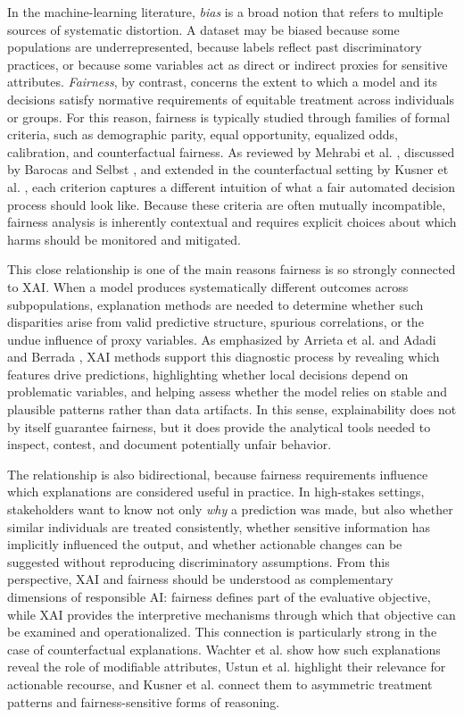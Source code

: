 In the machine-learning literature, \emph{bias} is a broad notion that refers to multiple sources of systematic distortion. A dataset may be biased because some populations are underrepresented, because labels reflect past discriminatory practices, or because some variables act as direct or indirect proxies for sensitive attributes. \emph{Fairness}, by contrast, concerns the extent to which a model and its decisions satisfy normative requirements of equitable treatment across individuals or groups. For this reason, fairness is typically studied through families of formal criteria, such as demographic parity, equal opportunity, equalized odds, calibration, and counterfactual fairness. As reviewed by Mehrabi et al. \cite{mehrabi2021}, discussed by Barocas and Selbst \cite{barocas2016big}, and extended in the counterfactual setting by Kusner et al. \cite{kusner2017counterfactual}, each criterion captures a different intuition of what a fair automated decision process should look like. Because these criteria are often mutually incompatible, fairness analysis is inherently contextual and requires explicit choices about which harms should be monitored and mitigated.

This close relationship is one of the main reasons fairness is so strongly connected to XAI. When a model produces systematically different outcomes across subpopulations, explanation methods are needed to determine whether such disparities arise from valid predictive structure, spurious correlations, or the undue influence of proxy variables. As emphasized by Arrieta et al. \cite{arrieta2020explainable} and Adadi and Berrada \cite{adadi2018peeking}, XAI methods support this diagnostic process by revealing which features drive predictions, highlighting whether local decisions depend on problematic variables, and helping assess whether the model relies on stable and plausible patterns rather than data artifacts. In this sense, explainability does not by itself guarantee fairness, but it does provide the analytical tools needed to inspect, contest, and document potentially unfair behavior.

The relationship is also bidirectional, because fairness requirements influence which explanations are considered useful in practice. In high-stakes settings, stakeholders want to know not only \emph{why} a prediction was made, but also whether similar individuals are treated consistently, whether sensitive information has implicitly influenced the output, and whether actionable changes can be suggested without reproducing discriminatory assumptions. From this perspective, XAI and fairness should be understood as complementary dimensions of responsible AI: fairness defines part of the evaluative objective, while XAI provides the interpretive mechanisms through which that objective can be examined and operationalized. This connection is particularly strong in the case of counterfactual explanations. Wachter et al. \cite{wachter2017counterfactual} show how such explanations reveal the role of modifiable attributes, Ustun et al. \cite{ustun2019actionable} highlight their relevance for actionable recourse, and Kusner et al. \cite{kusner2017counterfactual} connect them to asymmetric treatment patterns and fairness-sensitive forms of reasoning.

